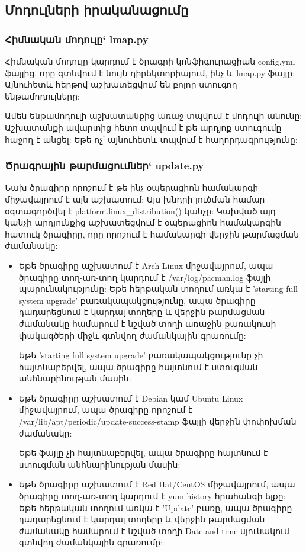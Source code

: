 \documentclass[a4paper,12pt]{article}
\begin{document}
\begin{sloppypar}
\subsection{Մոդուլների իրականացումը}


\subsubsection{Հիմնական մոդուլը` lmap.py}


Հիմնական մոդուլը կարդում է ծրագրի կոնֆիգուրացիան config.yml ֆայլից,
որը գտնվում է նույն դիրեկտորիայում, ինչ և lmap.py ֆայլը: Այնուհետև
հերթով աշխատեցվում են բոլոր ստուգող ենթամոդուլները:

Ամեն ենթամոդուլի աշխատանքից առաջ տպվում է մոդուլի անունը:
Աշխատանքի ավարտից հետո տպվում է թե արդյոք ստուգումը հաջող է անցել:
Եթե ոչ՝ այնուհետև տպվում է հաղորդագրությունը:


\subsubsection{Ծրագրային թարմացումներ` update.py}


Նախ ծրագիրը որոշում է թե ինչ օպերացիոն համակարգի միջավայրում է այն աշխատում:
Այս խնդրի լուծման համար օգտագործվել է platform.linux\_distribution() կանչը:
Կախված այդ կանչի արդյունքից աշխատեցվում է օպերացիոն համակարգին հատուկ
ծրագիրը, որը որոշում է համակարգի վերջին թարմացման ժամանակը:

\begin{itemize}
\item Եթե ծրագիրը աշխատում է Arch Linux միջավայրում, ապա ծրագիրը տող-առ-տող
    կարդում է /var/log/pacman.log ֆայլի պարունակությունը: Եթե հերթական տողում առկա է
	'starting full system upgrade' բառակապակցությունը, ապա ծրագիրը դադարեցնում
	է կարդալ տողերը և վերջին թարմացման ժամանակը համարում է նշված տողի առաջին
	քառակուսի փակագծերի միջև գտնվող ժամանկային գրառումը:

	Եթե 'starting full system upgrade' բառակապակցությունը չի հայտնաբերվել,
	ապա ծրագիրը հայտնում է ստուգման անհնարինության մասին:
\item Եթե ծրագիրը աշխատում է Debian կամ Ubuntu Linux միջավայրում, ապա ծրագիրը
	որոշում է /var/lib/apt/periodic/update-success-stamp ֆայլի վերջին փոփոխման
	ժամանակը:

	Եթե ֆայլը չի հայտնաբերվել, ապա ծրագիրը հայտնում է ստուգման անհնարինության
	մասին:
\item Եթե ծրագիրը աշխատում է Red Hat/CentOS միջավայրում, ապա ծրագիրը տող-առ-տող
    կարդում է yum history հրահանգի ելքը: Եթե հերթական տողում առկա է
	'Update' բառը, ապա ծրագիրը դադարեցնում
	է կարդալ տողերը և վերջին թարմացման ժամանակը համարում է նշված տողի 
	Date and time սյունակում գտնվող ժամանկային գրառումը:


\end{itemize}
\end{sloppypar}
\end{document}
